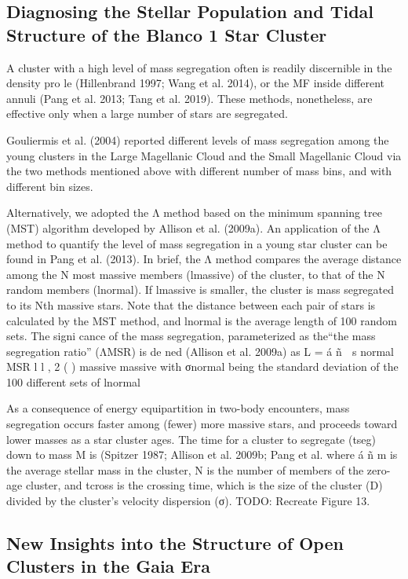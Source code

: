 \documentclass[../main.tex]{subfiles}
\begin{document}
{\subsection{Diagnosing the Stellar Population and Tidal Structure of the Blanco 1 Star Cluster}

A cluster with a high level of mass segregation often is
readily discernible in the density pro le (Hillenbrand 1997;
Wang et al. 2014), or the MF inside different annuli (Pang et al.
2013; Tang et al. 2019). These methods, nonetheless, are
effective only when a large number of stars are segregated.

Gouliermis et al. (2004) reported different levels of mass
segregation among the young clusters in the Large Magellanic Cloud and the Small Magellanic Cloud via the two methods mentioned above with different number of mass bins, and with
different bin sizes.

Alternatively, we adopted the Λ method based on the minimum spanning tree (MST) algorithm developed by Allison et al. (2009a). An application of the Λ method to quantify the level of mass segregation in a young star cluster can be found in Pang et al. (2013). In brief, the Λ method compares the average distance among the N most massive members (lmassive) of the cluster, to that of the N random members (lnormal). If lmassive is smaller, the cluster is mass segregated to its Nth
massive stars. Note that the distance between each pair of stars
is calculated by the MST method, and lnormal is the average
length of 100 random sets. The signi cance of the mass
segregation, parameterized as the“the mass segregation ratio”
(ΛMSR) is de ned (Allison et al. 2009a) as
L = á ñ 
s
normal
MSR
l l , 2
( )
massive
massive
with σnormal being the standard deviation of the 100 different
sets of lnormal

As a consequence of energy equipartition in two-body
encounters, mass segregation occurs faster among (fewer) more
massive stars, and proceeds toward lower masses as a star
cluster ages. The time for a cluster to segregate (tseg) down to mass M is (Spitzer 1987; Allison et al. 2009b; Pang et al.
where á ñ
m is the average stellar mass in the cluster, N is the number of members of the zero-age cluster, and tcross is the crossing time, which is the size of the cluster (D) divided by the cluster’s velocity dispersion (σ).
TODO: Recreate Figure 13.

\subsection{New Insights into the Structure of Open Clusters in the Gaia Era}

}
\end{document}
